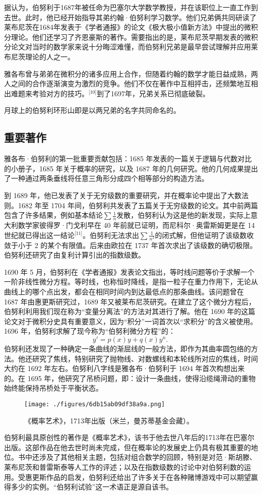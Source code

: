 据认为，伯努利于1687年被任命为巴塞尔大学数学教授，并在该职位上一直工作到去世。此时，他已经开始指导其弟约翰·伯努利学习数学。他们兄弟俩共同研读了莱布尼茨在1684年发表于《学者通报》的论文《极大极小值新方法》中提出的微积分理论。他们还学习了齐恩豪斯的著作。需要指出的是，莱布尼茨早期发表的微积分论文对当时的数学家来说十分晦涩难懂，而伯努利兄弟是最早尝试理解并应用莱布尼茨理论的人之一。

雅各布曾与弟弟在微积分的诸多应用上合作，但随着约翰的数学才能日益成熟，两人之间的合作逐渐演变为激烈的竞争。他们不仅在著作中互相抨击，还频繁地互相出难题来考验对方的技巧。\(^\text{[10]}\)到了1697年，兄弟关系已彻底破裂。

月球上的伯努利环形山即是以两兄弟的名字共同命名的。
\subsection{重要著作}
雅各布·伯努利的第一批重要贡献包括：1685 年发表的一篇关于逻辑与代数对比的小册子，1685 年关于概率的研究，以及 1687 年的几何研究。他的几何成果提出了一种通过两条垂线将任意三角形分成四个相等部分的构造方法。

到 1689 年，他已发表了关于无穷级数的重要研究，并在概率论中提出了大数法则。1682 年至 1704 年间，伯努利共发表了五篇关于无穷级数的论文。其中前两篇包含了许多结果，例如基本结论$\sum \frac{1}{n}$发散，伯努利认为这是他的新发现，实际上意大利数学家彼得罗·门戈利早在 40 年前就已证明，而尼科尔·奥雷斯姆更是在 14 世纪就已得出这一结论\(^\text{[11]}\)。伯努利无法求出$\sum \frac{1}{n^2}$的闭式解，但他证明了该级数收敛于小于 2 的某个有限值。后来由欧拉在 1737 年首次求出了该级数的确切极限。伯努利还研究了由复利计算引出的指数级数。

1690 年 5 月，伯努利在《学者通报》发表论文指出，等时线问题等价于求解一个一阶非线性微分方程。等时线，也称恒时降线，是指一粒子在重力作用下，无论从曲线上的哪个点出发，都会在相同时间内到达最低点的那条曲线。该问题曾在 1687 年由惠更斯研究过，1689 年又被莱布尼茨研究。在建立了这个微分方程后，伯努利利用我们现在称为“变量分离法”的方法对其进行了解。他在 1690 年的这篇论文对于微积分史具有重要意义，因为“积分”一词首次以“求积分”的含义被使用。1696 年，伯努利求解了现今称为“伯努利微分方程”的：
$$
y' = p(x)y + q(x)y^n.~
$$
伯努利还发现了一种确定一条曲线的渐屈线的一般方法，即作为其曲率圆包络的方法。他还研究了焦线，特别研究了抛物线、对数螺线和本轮线所对应的焦线，时间大约在 1692 年左右。伯努利八字线是雅各布·伯努利于 1694 年首次构想出来的。在 1695 年，他研究了吊桥问题，即：设计一条曲线，使得沿缆绳滑动的重物始终能保持吊桥处于平衡状态。
\begin{figure}[ht]
\centering
\texttt{[image: ./figures/6db15ab09df38a9a.png]}
\caption{《概率艺术》，1713年出版（米兰，曼苏蒂基金会藏）。} \label{fig_YGBbnl_3}
\end{figure}
伯努利最具原创性的著作是《概率艺术》，该书于他去世八年后的1713年在巴塞尔出版。这部作品在他去世时尚未完成，但在概率论的发展史上仍具有极其重要的地位。书中还涉及了其他相关主题，包括对组合数学的回顾，特别是对范·斯胡滕、莱布尼茨和普雷斯泰等人工作的评述；以及在指数级数的讨论中对伯努利数的运用。受惠更斯作品的启发，伯努利还给出了许多关于在各种赌博游戏中可以期望赢得多少的实例。“伯努利试验”这一术语正是源自该书。

